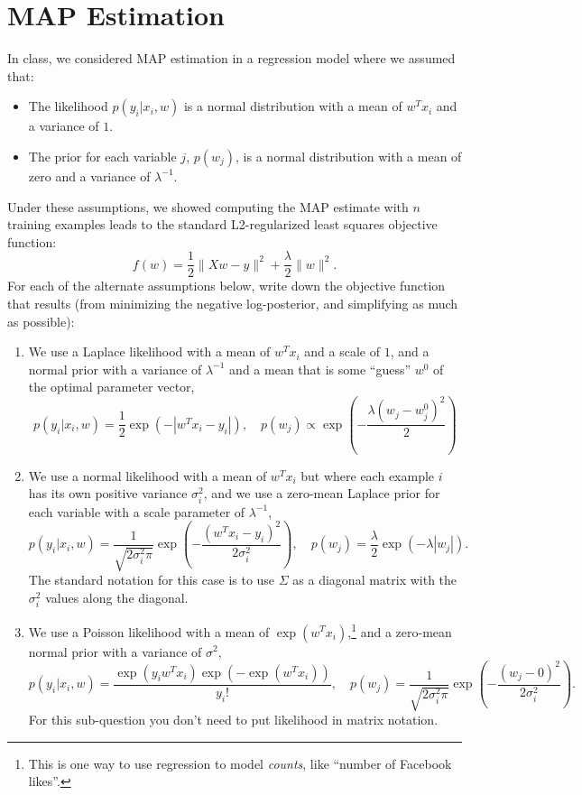 \documentclass{article}
\def\blu#1{{\color{blu}#1}}
\def\norm#1{\|#1\|}
\def\items#1{\begin{itemize}#1\end{itemize}}
\def\enum#1{\begin{enumerate}#1\end{enumerate}}
\begin{document}
\section{MAP Estimation}

In class, we considered MAP estimation in a regression model where we assumed that:
\items{
\item The likelihood $p(y_i | x_i, w)$ is a normal distribution with a mean of $w^Tx_i$ and a variance of $1$.
\item The prior for each variable $j$, $p(w_j)$, is a normal distribution with a mean of zero and a variance of $\lambda^{-1}$.
}
Under these assumptions, we showed computing the MAP estimate with $n$ training examples leads to the standard L2-regularized least squares objective function:
\[
f(w) = \frac{1}{2}\norm{Xw - y}^2 + \frac \lambda 2 \norm{w}^2.
\]
\blu{For each of the alternate assumptions below, write down the objective function that results} (from minimizing the negative log-posterior, and simplifying as much as possible):
\enum{
\item We use a Laplace likelihood with a mean of $w^Tx_i$ and a scale of $1$, and a normal prior with a variance of $\lambda^{-1}$ and a mean that is some ``guess'' $w^0$ of the optimal parameter vector,
\[
p(y_i | x_i, w) = \frac 1 2 \exp(-|w^Tx_i - y_i|), \quad p(w_j) \propto \exp\left(-\frac{\lambda(w_j -  w^0_j)^2}{2}\right)
\]
\item We use a normal  likelihood with a mean of $w^Tx_i$ but where each example $i$ has its own  positive variance $\sigma_i^2$, and we use a zero-mean Laplace prior for each variable with a scale parameter of $\lambda^{-1}$,
\[
p(y_i | x_i,w) = \frac{1}{\sqrt{2\sigma_i^2\pi}}\exp\left(-\frac{(w^Tx_i - y_i)^2}{2\sigma_i^2}\right), \quad p(w_j) = \frac{\lambda}{2}\exp(-\lambda|w_j|).
\]
The standard notation for this case is to use $\Sigma$ as a diagonal matrix with the $\sigma_i^2$ values along the diagonal.
\item We use a Poisson likelihood with a mean of $\exp(w^Tx_i)$,\footnote{This is one way to use regression to model \emph{counts}, like ``number of Facebook likes''.} and a zero-mean normal prior with a variance of $\sigma^2$,
\[
p(y_i | x_i, w) = \frac{\exp(y_iw^Tx_i)\exp(-\exp(w^Tx_i))}{y_i!}, \quad p(w_j) = \frac{1}{\sqrt{2\sigma_i^2\pi}}\exp\left(-\frac{(w_j - 0)^2}{2\sigma_i^2}\right).
\]
For this sub-question you don't need to put likelihood in matrix notation.
}
\end{document}
